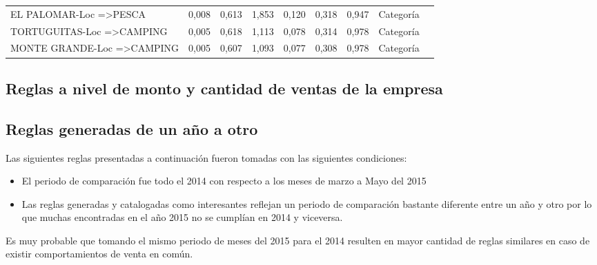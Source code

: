\documentclass[]{article}
\begin{document}
\begin{landscape}
\begin{table}[h]
\begin{tabular}{lllllllll}
 			EL PALOMAR-Loc =\textgreater PESCA                                                    & 0,008   & 0,613      & 1,853  & 0,120  & 0,318      & 0,947 & Categoría           &  \\
 			TORTUGUITAS-Loc =\textgreater CAMPING                                                 & 0,005   & 0,618      & 1,113  & 0,078  & 0,314      & 0,978 & Categoría           &  \\
 			MONTE GRANDE-Loc =\textgreater CAMPING                                                & 0,005   & 0,607      & 1,093  & 0,077  & 0,308      & 0,978 & Categoría           & 
 		\end{tabular}
 	\end{table}
 \end{landscape}
 \restoregeometry

\subsection{Reglas a nivel de monto y cantidad de ventas de la empresa}

\subsection{Reglas generadas de un año a otro}
Las siguientes reglas presentadas a continuación fueron tomadas con las siguientes condiciones:\\
\begin{itemize}
	\item El periodo de comparación fue todo el 2014 con respecto a los meses de marzo a Mayo del 2015\\
	\item Las reglas generadas y catalogadas como interesantes reflejan un periodo de comparación bastante diferente entre un año y otro por lo que muchas encontradas en el año 2015 no se cumplían en 2014 y viceversa.\\
\end{itemize}

Es muy probable que tomando el mismo periodo de meses del 2015 para el 2014 resulten en mayor cantidad de reglas similares en caso de existir comportamientos de venta en común.\\
\end{document}
